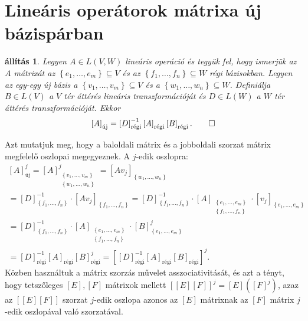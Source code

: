 \documentclass[a4paper, showtrims]{memoir}
\makeatletter
\renewenvironment{proof}[1][\proofname]
    {\par\pushQED{\qed}%
    \normalfont \topsep6\p@\@plus6\p@\relax
    \trivlist
    \item[\hskip\labelsep
        \itshape
    #1\@addpunct{:}]\ignorespaces}
    {\popQED\endtrivlist\@endpefalse}
\theoremstyle{plain}
\newtheorem{proposition}{állítás}[chapter]
\theoremstyle{remark}
\theoremstyle{definition}
\newcommand{\uj}{\text{új}}
\newcommand{\rgi}{\text{régi}}
\makeatother
\begin{document}
\section{Lineáris operátorok mátrixa új bázispárban}
\begin{proposition}\label{pr:altbtrf}
	Legyen $A\in L\left( V,W \right)$ lineáris operáció
	és tegyük fel, hogy ismerjük az $A$ mátrixát az
	$\left\{ e_1,\ldots,e_m \right\}\subseteq V$ és az
	$\left\{ f_1,\ldots,f_n \right\}\subseteq W$ régi bázisokban.
	Legyen az egy-egy új bázis a $\left\{ v_1,\ldots,v_m \right\}\subseteq V$
	és a $\left\{ w_1,\ldots,w_n \right\}\subseteq W$.
	Definiálja $B\in L\left( V \right)$ a $V$ tér áttérés lineáris transzformációját
	és $D\in L\left( W \right)$ a $W$ tér áttérés transzformációját.
	Ekkor
	\[
		\left[ A \right]_{\uj}=
		\left[ D \right]_{\rgi}^{-1}\left[ A \right]_{\rgi}\left[ B \right]_{\rgi}.\qedhere
	\]
\end{proposition}
\begin{proof}
	Azt mutatjuk meg, hogy a baloldali mátrix és a jobboldali szorzat mátrix megfelelő oszlopai megegyeznek.
	A $j$-edik oszlopra:
	\begin{multline*}
		\left[ A \right]_{\uj}^j
		=
		\left[ A \right]_{\substack{\left\{ v_1,\ldots,v_m \right\}\\ \left\{ w_1,\ldots,w_n \right\}}}^j
		=
		\left[ Av_j \right]_{\left\{ w_1,\ldots,w_n \right\}}
		\\
		=
		\left[ D \right]^{-1}_{\left\{ f_1,\ldots,f_n \right\}}\cdot
		\left[ Av_j \right]_{\left\{ f_1,\ldots,f_n \right\}}
		=
		\left[ D \right]^{-1}_{\left\{ f_1,\ldots,f_n \right\}}\cdot
		\left[ A \right]_{\substack{\left\{ e_1,\ldots,e_m \right\}\\ \left\{ f_1,\ldots,f_n \right\}}}
		\cdot
		\left[ v_j \right]_{\left\{ e_1,\ldots,e_m \right\}}
		\\
		=
		\left[ D \right]^{-1}_{\left\{ f_1,\ldots,f_n \right\}}\cdot
		\left[ A \right]_{\substack{\left\{ e_1,\ldots,e_m \right\}\\ \left\{ f_1,\ldots,f_n \right\}}}
		\cdot
		\left[ B \right]_{\left\{ e_1,\ldots,e_m \right\}}^j
		\\
		=
		\left[ D \right]_\rgi^{-1}
		\left[ A \right]_\rgi
		\left[ B \right]_\rgi^j
		=
        \left[ \left[ D \right]^{-1}_\rgi\left[ A \right]_\rgi\left[ B \right]_\rgi \right]^j.
	\end{multline*}
	Közben használtuk a mátrix szorzás művelet asszociativitását,
	és azt a tényt,
	hogy tetszőleges $\left[ E \right],\left[ F \right]$ mátrixok mellett
    $\left[ \left[ E \right]\left[ F \right] \right]^j=\left[ E \right]\left( \left[F  \right]^j \right)$, azaz
    az $\left[ \left[ E \right]\left[ F \right] \right]$ szorzat $j$-edik oszlopa azonos az $\left[ E \right]$ mátrixnak az $\left[ F \right]$ mátrix $j$-edik oszlopával való szorzatával.
\end{proof}
\end{document}
